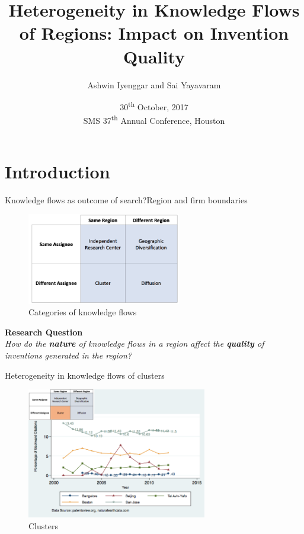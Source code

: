 \documentclass{beamer}
\title{Heterogeneity in Knowledge Flows of Regions: Impact on Invention Quality}
\author{Ashwin Iyenggar and Sai Yayavaram}
\institute[Indian Institute of Management Bangalore] 
{
  Strategy Area\\
  Indian Institute of Management Bangalore
}
\date{30\textsuperscript{th} October, 2017 \\ SMS 37\textsuperscript{th} Annual Conference, Houston}
\begin{document}
\begin{frame}
  \titlepage
\end{frame}



\section{Introduction}

\begin{frame}{Knowledge flows as outcome of search?}{Region and firm boundaries}
\begin{figure}[h!]
\begin{centering}
  \includegraphics[width=0.6\textwidth]{2x2old}
  \caption{Categories of knowledge flows}
   \label{fig:2x2old}
\end{centering}
\end{figure}
\textbf{Research Question}\\
\textit{How do the \textbf{nature} of knowledge flows in a region affect the \textbf{quality} of inventions generated in the region?}
\end{frame}

\begin{frame}{Heterogeneity in knowledge flows of clusters}
\begin{figure}[h]
\begin{centering}
  \includegraphics[width=0.7\textwidth]{SMSSameRegionDiffAssigneeFlows.png}
  \caption{Clusters}
   \label{fig:SMSSameRegionDiffAssigneeFlows}
\end{centering}
\end{figure}
\end{frame}
\end{document}
